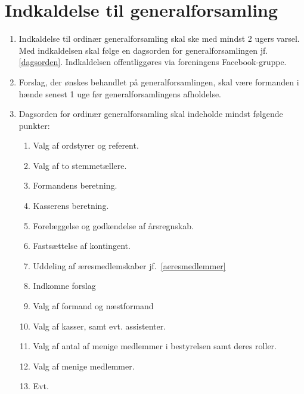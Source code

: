 \documentclass[a4paper, 10pt]{article}
\renewcommand\thesection{\textsection\arabic{section}}
\newenvironment{stykenum}{
  \begin{enumerate}[%
    label=Stk.~\arabic*:, ref=\thesection~Stk.~\arabic{enumi}, start=1]
}{\end{enumerate}}
\begin{document}
\section{Indkaldelse til generalforsamling}
\begin{stykenum}
    \item Indkaldelse til ordinær generalforsamling skal ske med mindst 2 ugers
        varsel. Med indkaldelsen skal følge en dagsorden for generalforsamlingen
        jf. \ref{dagsorden}. Indkaldelsen offentliggøres via foreningens
        Facebook-gruppe.

    \item Forslag, der ønskes behandlet på generalforsamlingen, skal være
        formanden i hænde senest 1 uge før generalforsamlingens afholdelse.

    \item \label{dagsorden} Dagsorden for ordinær generalforsamling skal
        indeholde mindst følgende punkter:
        \begin{enumerate}[label=\arabic*.]
            \item Valg af ordstyrer og referent.

            \item Valg af to stemmetællere.

            \item Formandens beretning.

            \item Kasserens beretning.

            \item Forelæggelse og godkendelse af årsregnskab.

            \item Fastsættelse af kontingent.

            \item Uddeling af æresmedlemskaber jf.~\ref{aeresmedlemmer}

            \item Indkomne forslag

            \item Valg af formand og næstformand

            \item Valg af kasser, samt evt.  assistenter.

            \item Valg af antal af menige medlemmer i bestyrelsen samt deres
                roller.

            \item Valg af menige medlemmer.

            \item Evt.
        \end{enumerate}
\end{stykenum}
\end{document}
